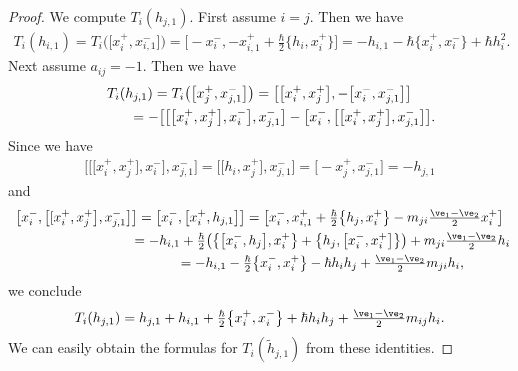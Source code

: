 \begin{proof}
We compute $T_{i}(h_{j,1})$. First assume $i=j$. Then we have
\begin{gather*}
T_i(h_{i,1}) = T_i\big(\big[x_{i}^+,x_{i,1}^-\big]\big) = \big[{-}x_{i}^-, -x_{i,1}^+ + \tfrac{\hbar}{2}\big\{ h_i, x_i^+ \big\}\big] = -h_{i,1} - \hbar \big\{x_i^+,x_i^-\big\} + \hbar h_i^2.
\end{gather*}
Next assume $a_{ij}=-1$. Then we have
\begin{gather*}
T_i(h_{j,1}) = T_i\big(\big[x_{j}^+,x_{j,1}^-\big]\big) = \big[\big[x_i^+,x_{j}^+\big], -\big[x_i^-,x_{j,1}^-\big]\big] \\
\hphantom{T_i(h_{j,1})}{} = - \big[\big[\big[x_i^+,x_j^+\big],x_i^-\big],x_{j,1}^-\big]-\big[x_i^-,\big[\big[x_i^+,x_j^+\big],x_{j,1}^-\big]\big].
\end{gather*}
Since we have
\begin{gather*}
\big[\big[\big[x_i^+,x_j^+\big],x_i^-\big],x_{j,1}^-\big]=\big[\big[h_i,x_j^+\big],x_{j,1}^-\big]=\big[{-}x_j^+,x_{j,1}^-\big]=-h_{j,1}
\end{gather*}
and
\begin{gather*}
\big[x_i^-,\big[[x_i^+,x_j^+\big],x_{j,1}^-\big]\big] =\big[x_i^-,\big[x_i^+,h_{j,1}\big]\big] = \big[x_i^-,x_{i,1}^++\tfrac{\hbar}{2}\big\{h_j,x_i^+\big\}-m_{ji}\tfrac{\ve_1 - \ve_2}{2} x_i^+\big] \\
\hphantom{\big[x_i^-,\big[[x_i^+,x_j^+\big],x_{j,1}^-\big]\big]}{} = -h_{i,1} + \tfrac{\hbar}{2}\big( \big\{\big[x_i^-,h_j\big],x_i^+\big\} + \big\{ h_j, \big[x_i^-, x_i^+\big] \big\}\big) + m_{ji}\tfrac{\ve_1 - \ve_2}{2} h_i \\
\hphantom{\big[x_i^-,\big[[x_i^+,x_j^+\big],x_{j,1}^-\big]\big]}{} = -h_{i,1} - \tfrac{\hbar}{2} \big\{x_i^-,x_i^+\big\} - \hbar h_i h_j + \tfrac{\ve_1 - \ve_2}{2}m_{ji} h_i,
\end{gather*}
we conclude
\begin{gather*}
T_i(h_{j,1})=h_{j,1}+h_{i,1}+\tfrac{\hbar}{2} \big\{x_i^+,x_i^-\big\} + \hbar h_i h_j + \tfrac{\ve_1 - \ve_2}{2}m_{ij} h_i.
\end{gather*}
We can easily obtain the formulas for $T_{i}(\tilde{h}_{j,1})$ from these identities.
\end{proof}

